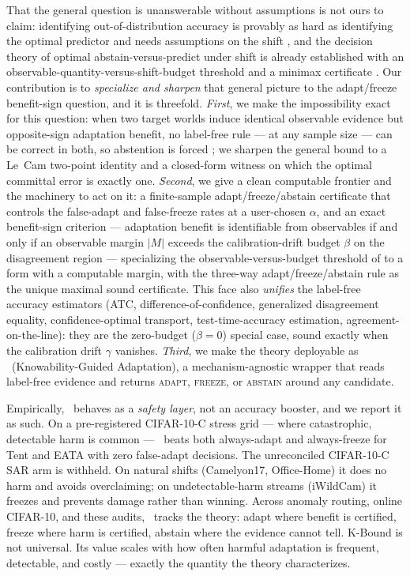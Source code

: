 That the general question is unanswerable without assumptions is not ours to claim:
identifying out-of-distribution accuracy is provably as hard as identifying the optimal
predictor and needs assumptions on the shift \cite{garg2022atc}, and the decision theory
of optimal abstain-versus-predict under shift is already established with an
observable-quantity-versus-shift-budget threshold and a minimax certificate
\cite{kalai2021abstain}. Our contribution is to \emph{specialize and sharpen} that
general picture to the adapt/freeze benefit-sign question, and it is threefold.
\emph{First}, we make the impossibility exact for this question: when two target worlds
induce identical observable evidence but opposite-sign adaptation benefit, no label-free
rule --- at any sample size --- can be correct in both, so abstention is forced
\cite{garg2022atc,kalai2021abstain}; we sharpen the general bound to a Le~Cam two-point
identity and a closed-form witness on which the optimal committal error is exactly one.
\emph{Second}, we give a clean computable frontier and the machinery to act on it: a
finite-sample adapt/freeze/abstain certificate that controls the false-adapt and
false-freeze rates at a user-chosen $\alpha$, and an exact benefit-sign criterion ---
adaptation benefit is identifiable from observables if and only if an observable margin
$|M|$ exceeds the calibration-drift budget $\beta$ on the disagreement region ---
specializing the observable-versus-budget threshold of \cite{kalai2021abstain} to a
form with a computable margin, with the three-way adapt/freeze/abstain rule as the
unique maximal sound certificate. This face also \emph{unifies} the label-free accuracy
estimators (ATC, difference-of-confidence, generalized disagreement equality,
confidence-optimal transport, test-time-accuracy estimation, agreement-on-the-line): they
are the zero-budget ($\beta=0$) special case, sound exactly when the calibration drift
$\gamma$ vanishes. \emph{Third}, we make the theory deployable as \KGA\
(Knowability-Guided Adaptation), a mechanism-agnostic wrapper that reads label-free
evidence and returns \textsc{adapt}, \textsc{freeze}, or \textsc{abstain} around any
candidate.

Empirically, \KGA\ behaves as a \emph{safety layer}, not an accuracy booster, and we
report it as such. On a pre-registered CIFAR-10-C stress grid --- where catastrophic,
detectable harm is common --- \KGA\ beats both always-adapt and always-freeze for
Tent and EATA with zero false-adapt decisions. The unreconciled CIFAR-10-C SAR arm is withheld.
On natural shifts (Camelyon17, Office-Home) it does no harm and avoids overclaiming;
on undetectable-harm streams (iWildCam) it freezes and prevents damage rather than
winning. Across anomaly routing, online CIFAR-10, and these audits, \KGA\ tracks the
theory: adapt where benefit is certified, freeze where harm is certified, abstain
where the evidence cannot tell. K-Bound is not universal. Its value scales with how
often harmful adaptation is frequent, detectable, and costly --- exactly the quantity
the theory characterizes.

